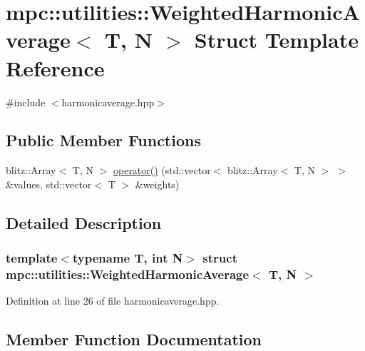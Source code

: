 \hypertarget{structmpc_1_1utilities_1_1_weighted_harmonic_average}{}\section{mpc\+:\+:utilities\+:\+:Weighted\+Harmonic\+Average$<$ T, N $>$ Struct Template Reference}
\label{structmpc_1_1utilities_1_1_weighted_harmonic_average}


{\ttfamily \#include $<$harmonicaverage.\+hpp$>$}

\subsection*{Public Member Functions}
\begin{DoxyCompactItemize}
\item 
blitz\+::\+Array$<$ T, N $>$ \mbox{\hyperlink{structmpc_1_1utilities_1_1_weighted_harmonic_average_a6129b4ae0befbf7eedac628c1c1eecfc}{operator()}} (std\+::vector$<$ blitz\+::\+Array$<$ T, N $>$ $>$ \&values, std\+::vector$<$ T $>$ \&weights)
\end{DoxyCompactItemize}


\subsection{Detailed Description}
\subsubsection*{template$<$typename T, int N$>$\newline
struct mpc\+::utilities\+::\+Weighted\+Harmonic\+Average$<$ T, N $>$}



Definition at line 26 of file harmonicaverage.\+hpp.



\subsection{Member Function Documentation}
\mbox{\label{structmpc_1_1utilities_1_1_weighted_harmonic_average_a6129b4ae0befbf7eedac628c1c1eecfc}} 
